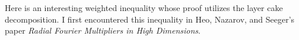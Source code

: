 %

Here is an interesting weighted inequality whose proof utilizes the layer cake decomposition. I first encountered this inequality in Heo, Nazarov, and Seeger's paper \emph{Radial Fourier Multipliers in High Dimensions}.

